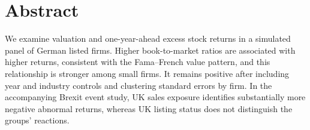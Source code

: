 \section*{Abstract}

We examine valuation and one-year-ahead excess stock returns in a simulated panel of German listed firms. Higher book-to-market ratios are associated with higher returns, consistent with the Fama--French value pattern, and this relationship is stronger among small firms. It remains positive after including year and industry controls and clustering standard errors by firm. In the accompanying Brexit event study, UK sales exposure identifies substantially more negative abnormal returns, whereas UK listing status does not distinguish the groups' reactions.
